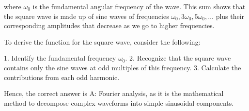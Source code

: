 where \( \omega_0 \) is the fundamental angular frequency of the wave. This sum shows that the square wave is made up of sine waves of frequencies \( \omega_0, 3\omega_0, 5\omega_0, \ldots \) plus their corresponding amplitudes that decrease as we go to higher frequencies.

To derive the function for the square wave, consider the following:

1. Identify the fundamental frequency \( \omega_0 \).
2. Recognize that the square wave contains only the sine waves at odd multiples of this frequency.
3. Calculate the contributions from each odd harmonic.

Hence, the correct answer is A: Fourier analysis, as it is the mathematical method to decompose complex waveforms into simple sinusoidal components.

